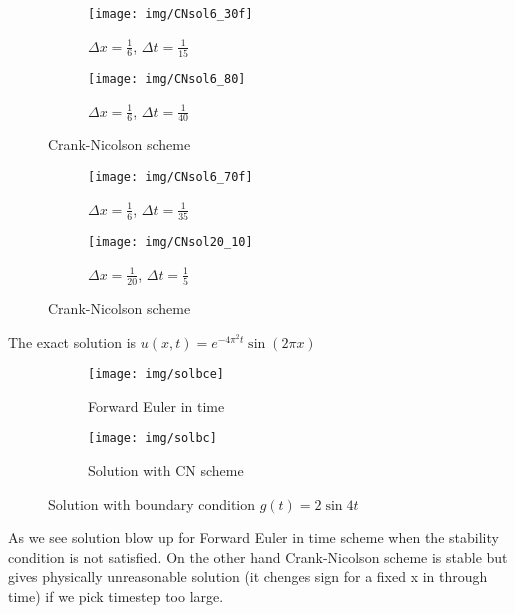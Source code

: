 \documentclass{article}
\begin{document}
\begin{flushleft}
\begin{figure}
    \centering
    \begin{subfigure}[t]{0.5\textwidth}
        \texttt{[image: img/CNsol6\_30f]}
        \caption{$\Delta x = \frac{1}{6}$, $\Delta t = \frac{1}{15}$}
        \label{fig:gull}
    \end{subfigure}
    \begin{subfigure}[t]{0.4\textwidth}
        \texttt{[image: img/CNsol6\_80]}
        \caption{$\Delta x = \frac{1}{6}$, $\Delta t = \frac{1}{40}$  }
        \label{fig:tiger}
    \end{subfigure}
    \caption{Crank-Nicolson scheme}\label{fig:animals}
\end{figure}

\begin{figure}
    \centering
    \begin{subfigure}[t]{0.5\textwidth}
        \texttt{[image: img/CNsol6\_70f]}
        \caption{$\Delta x = \frac{1}{6}$, $\Delta t = \frac{1}{35}$}
        \label{fig:gull}
    \end{subfigure}
    \begin{subfigure}[t]{0.4\textwidth}
        \texttt{[image: img/CNsol20\_10]}
        \caption{$\Delta x = \frac{1}{20}$, $\Delta t = \frac{1}{5}$  }
        \label{fig:tiger}
    \end{subfigure}
    \caption{Crank-Nicolson scheme}\label{fig:animals}
\end{figure}

The exact solution is  $u(x,t) = e^{-4\pi^2 t}\sin(2\pi x)$

\begin{figure}
    \centering
    \begin{subfigure}[t]{0.5\textwidth}
        \texttt{[image: img/solbce]}
        \caption{Forward Euler in time}
        \label{fig:gull}
    \end{subfigure}
    \begin{subfigure}[t]{0.4\textwidth}
        \texttt{[image: img/solbc]}
        \caption{Solution with CN scheme}
        \label{fig:tiger}
    \end{subfigure}
    \caption{Solution with boundary condition $g(t) = 2\sin{4t}$}\label{fig:animals}
\end{figure}

As we see solution blow up for Forward Euler in time scheme when the stability condition is not 
satisfied. On the other hand Crank-Nicolson scheme is stable but gives physically unreasonable solution
(it chenges sign for a fixed x in through time) if we pick timestep too large.

\end{flushleft}
\end{document}
